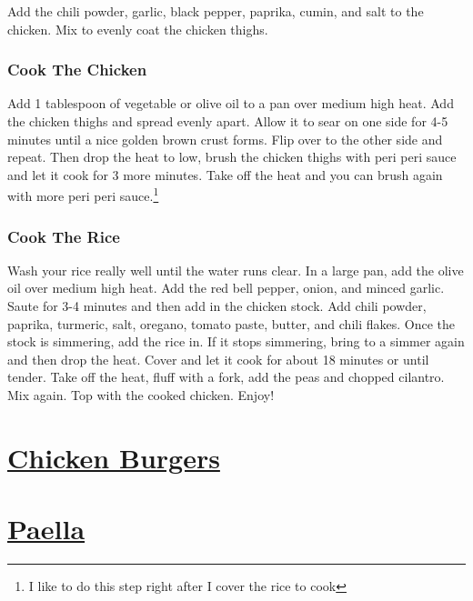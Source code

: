 \documentclass[
]{article}
\begin{document}
Add the chili powder, garlic, black pepper, paprika, cumin, and salt to the chicken. Mix to evenly coat the chicken thighs.

\hypertarget{cook-the-chicken}{%
\subsubsection{Cook The Chicken}\label{cook-the-chicken}}

Add 1 tablespoon of vegetable or olive oil to a pan over medium high heat. Add the chicken thighs and spread evenly apart. Allow it to sear on one side for 4-5 minutes until a nice golden brown crust forms. Flip over to the other side and repeat. Then drop the heat to low, brush the chicken thighs with peri peri sauce and let it cook for 3 more minutes. Take off the heat and you can brush again with more peri peri sauce.\footnote{I like to do this step right after I cover the rice to cook}

\hypertarget{cook-the-rice}{%
\subsubsection{Cook The Rice}\label{cook-the-rice}}

Wash your rice really well until the water runs clear. In a large pan, add the olive oil over medium high heat. Add the red bell pepper, onion, and minced garlic. Saute for 3-4 minutes and then add in the chicken stock. Add chili powder, paprika, turmeric, salt, oregano, tomato paste, butter, and chili flakes. Once the stock is simmering, add the rice in. If it stops simmering, bring to a simmer again and then drop the heat. Cover and let it cook for about 18 minutes or until tender. Take off the heat, fluff with a fork, add the peas and chopped cilantro. Mix again. Top with the cooked chicken. Enjoy!

\hypertarget{chicken-burgers}{%
\section{\texorpdfstring{\href{https://www.foodnetwork.com/recipes/rachael-ray/bbq-chicken-burgers-with-slaw-recipe-1917239}{Chicken Burgers}}{Chicken Burgers}}\label{chicken-burgers}}

\hypertarget{paella}{%
\section{\texorpdfstring{\href{https://www.seriouseats.com/recipes/2019/09/stovetop-paella-mixta-for-two-with-chicken-and-shrimp.html}{Paella}}{Paella}}\label{paella}}
\end{document}
